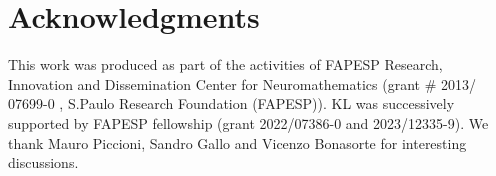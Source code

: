 \documentclass[a4paper]{article}
\begin{document}
\section*{Acknowledgments}


This work was produced as part of the activities of FAPESP Research, Innovation and Dissemination Center for Neuromathematics (grant \# 2013/ 07699-0 , S.Paulo Research Foundation (FAPESP)). 
KL was successively supported by FAPESP fellowship (grant 2022/07386-0 and 2023/12335-9). We thank Mauro Piccioni, Sandro Gallo and Vicenzo Bonasorte for interesting discussions.




%
%
%


\end{document}
